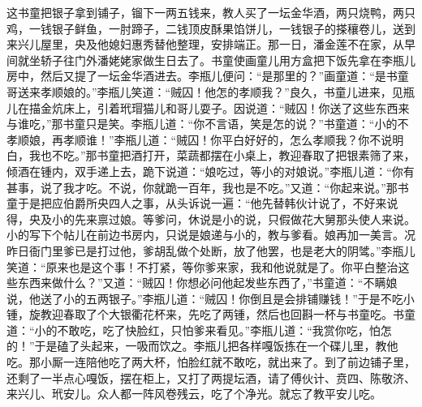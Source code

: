 这书童把银子拿到铺子，镏下一两五钱来，教人买了一坛金华酒，两只烧鸭，两只鸡，一钱银子鲜鱼，一肘蹄子，二钱顶皮酥果馅饼儿，一钱银子的搽穰卷儿，送到来兴儿屋里，央及他媳妇惠秀替他整理，安排端正。那一日，潘金莲不在家，从早间就坐轿子往门外潘姥姥家做生日去了。书童使画童儿用方盒把下饭先拿在李瓶儿房中，然后又提了一坛金华酒进去。李瓶儿便问：“是那里的？”画童道：“是书童哥送来孝顺娘的。”李瓶儿笑道：“贼囚！他怎的孝顺我？”良久，书童儿进来，见瓶儿在描金炕床上，引着玳瑁猫儿和哥儿耍子。因说道：“贼囚！你送了这些东西来与谁吃，”那书童只是笑。李瓶儿道：“你不言语，笑是怎的说？”书童道：“小的不孝顺娘，再孝顺谁！”李瓶儿道：“贼囚！你平白好好的，怎么孝顺我？你不说明白，我也不吃。”那书童把酒打开，菜蔬都摆在小桌上，教迎春取了把银素筛了来，倾酒在锺内，双手递上去，跪下说道：“娘吃过，等小的对娘说。”李瓶儿道：“你有甚事，说了我才吃。不说，你就跪一百年，我也是不吃。”又道：“你起来说。”那书童于是把应伯爵所央四人之事，从头诉说一遍：“他先替韩伙计说了，不好来说得，央及小的先来禀过娘。等爹问，休说是小的说，只假做花大舅那头使人来说。小的写下个帖儿在前边书房内，只说是娘递与小的，教与爹看。娘再加一美言。况昨日衙门里爹已是打过他，爹胡乱做个处断，放了他罢，也是老大的阴骘。”李瓶儿笑道：“原来也是这个事！不打紧，等你爹来家，我和他说就是了。你平白整治这些东西来做什么？”又道：“贼囚！你想必问他起发些东西了，”书童道：“不瞒娘说，他送了小的五两银子。”李瓶儿道：“贼囚！你倒且是会排铺赚钱！”于是不吃小锺，旋教迎春取了个大银衢花杯来，先吃了两锺，然后也回斟一杯与书童吃。书童道：“小的不敢吃，吃了快脸红，只怕爹来看见。”李瓶儿道：“我赏你吃，怕怎的！”于是磕了头起来，一吸而饮之。李瓶儿把各样嘎饭拣在一个碟儿里，教他吃。那小厮一连陪他吃了两大杯，怕脸红就不敢吃，就出来了。到了前边铺子里，还剩了一半点心嘎饭，摆在柜上，又打了两提坛酒，请了傅伙计、贲四、陈敬济、来兴儿、玳安儿。众人都一阵风卷残云，吃了个净光。就忘了教平安儿吃。

